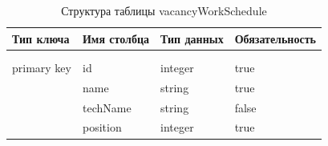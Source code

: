 \begin{xltabular}{\textwidth}{|l|l|p{1.7cm}|X|}
	\caption{Структура таблицы vacancyWorkSchedule \label{vacancyWorkSchedule:table}}\\ \hline
	\centrow Тип ключа & \centrow Имя столбца & \centrow Тип данных & \centrow Обязательность \\ \hline
	 &  &  &  \\ \hline
	\endfirsthead
	 &  &  &  \\ \hline
	\finishhead
	primary key & id & integer & true \\ \hline 
	& name & string & true \\ \hline 
	& techName & string & false \\ \hline 
	& position & integer & true \\ \hline
\end{xltabular}
